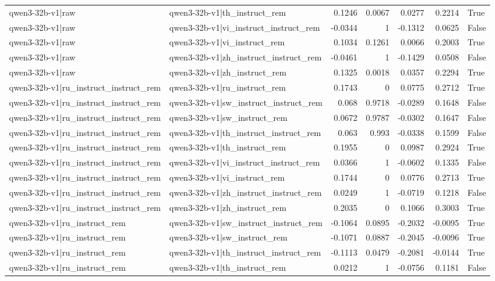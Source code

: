 \begin{table}
\begin{tabular}{l l r r r r l}
qwen3-32b-v1|raw & qwen3-32b-v1|th_instruct_rem & 0.1246 & 0.0067 & 0.0277 & 0.2214 & True \\
qwen3-32b-v1|raw & qwen3-32b-v1|vi_instruct_instruct_rem & -0.0344 & 1 & -0.1312 & 0.0625 & False \\
qwen3-32b-v1|raw & qwen3-32b-v1|vi_instruct_rem & 0.1034 & 0.1261 & 0.0066 & 0.2003 & True \\
qwen3-32b-v1|raw & qwen3-32b-v1|zh_instruct_instruct_rem & -0.0461 & 1 & -0.1429 & 0.0508 & False \\
qwen3-32b-v1|raw & qwen3-32b-v1|zh_instruct_rem & 0.1325 & 0.0018 & 0.0357 & 0.2294 & True \\
qwen3-32b-v1|ru_instruct_instruct_rem & qwen3-32b-v1|ru_instruct_rem & 0.1743 & 0 & 0.0775 & 0.2712 & True \\
qwen3-32b-v1|ru_instruct_instruct_rem & qwen3-32b-v1|sw_instruct_instruct_rem & 0.068 & 0.9718 & -0.0289 & 0.1648 & False \\
qwen3-32b-v1|ru_instruct_instruct_rem & qwen3-32b-v1|sw_instruct_rem & 0.0672 & 0.9787 & -0.0302 & 0.1647 & False \\
qwen3-32b-v1|ru_instruct_instruct_rem & qwen3-32b-v1|th_instruct_instruct_rem & 0.063 & 0.993 & -0.0338 & 0.1599 & False \\
qwen3-32b-v1|ru_instruct_instruct_rem & qwen3-32b-v1|th_instruct_rem & 0.1955 & 0 & 0.0987 & 0.2924 & True \\
qwen3-32b-v1|ru_instruct_instruct_rem & qwen3-32b-v1|vi_instruct_instruct_rem & 0.0366 & 1 & -0.0602 & 0.1335 & False \\
qwen3-32b-v1|ru_instruct_instruct_rem & qwen3-32b-v1|vi_instruct_rem & 0.1744 & 0 & 0.0776 & 0.2713 & True \\
qwen3-32b-v1|ru_instruct_instruct_rem & qwen3-32b-v1|zh_instruct_instruct_rem & 0.0249 & 1 & -0.0719 & 0.1218 & False \\
qwen3-32b-v1|ru_instruct_instruct_rem & qwen3-32b-v1|zh_instruct_rem & 0.2035 & 0 & 0.1066 & 0.3003 & True \\
qwen3-32b-v1|ru_instruct_rem & qwen3-32b-v1|sw_instruct_instruct_rem & -0.1064 & 0.0895 & -0.2032 & -0.0095 & True \\
qwen3-32b-v1|ru_instruct_rem & qwen3-32b-v1|sw_instruct_rem & -0.1071 & 0.0887 & -0.2045 & -0.0096 & True \\
qwen3-32b-v1|ru_instruct_rem & qwen3-32b-v1|th_instruct_instruct_rem & -0.1113 & 0.0479 & -0.2081 & -0.0144 & True \\
qwen3-32b-v1|ru_instruct_rem & qwen3-32b-v1|th_instruct_rem & 0.0212 & 1 & -0.0756 & 0.1181 & False \\

\end{tabular}
\end{table}
